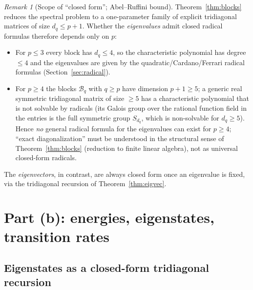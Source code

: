 \documentclass[12pt]{article}
\theoremstyle{definition}
\theoremstyle{remark}
\newtheorem{remark}{Remark}
\begin{document}
\begin{remark}[Scope of ``closed form''; Abel--Ruffini bound]\label{rem:closedform}
Theorem~\ref{thm:blocks} reduces the spectral problem to a one-parameter family of
explicit tridiagonal matrices of size $d_q\le p+1$. Whether the \emph{eigenvalues}
admit closed radical formulas therefore depends only on $p$:
\begin{itemize}
\item For $p\le3$ every block has $d_q\le4$, so the characteristic polynomial has
degree $\le4$ and the eigenvalues are given by the quadratic/Cardano/Ferrari radical
formulas (Section~\ref{sec:radical}).
\item For $p\ge4$ the blocks $\mathcal B_q$ with $q\ge p$ have dimension $p+1\ge5$;
a generic real symmetric tridiagonal matrix of size $\ge5$ has a characteristic
polynomial that is not solvable by radicals (its Galois group over the rational
function field in the entries is the full symmetric group $S_{d_q}$, which is
non-solvable for $d_q\ge5$). Hence \emph{no} general radical formula for the
eigenvalues can exist for $p\ge4$; ``exact diagonalization'' must be understood in
the structural sense of Theorem~\ref{thm:blocks} (reduction to finite linear
algebra), not as universal closed-form radicals.
\end{itemize}
The \emph{eigenvectors}, in contrast, are always closed form once an eigenvalue is
fixed, via the tridiagonal recursion of Theorem~\ref{thm:eigvec}.
\end{remark}

\section{Part (b): energies, eigenstates, transition rates}

\subsection{Eigenstates as a closed-form tridiagonal recursion}
\end{document}
